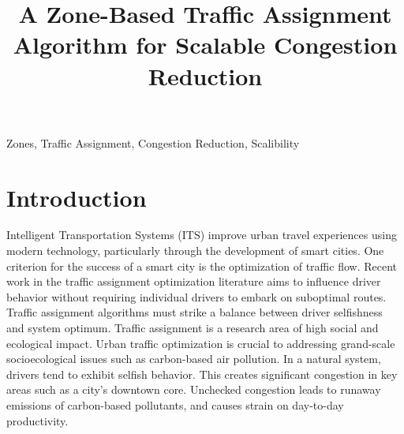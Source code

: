 \documentclass[conference]{IEEEtran}
\begin{document}
\raggedbottom

\title{A Zone-Based Traffic Assignment Algorithm for Scalable Congestion Reduction}


\author{
}

\maketitle

\begin{abstract}

\end{abstract}

\begin{IEEEkeywords}
Zones, Traffic Assignment, Congestion Reduction, Scalibility
\end{IEEEkeywords}

\IEEEpeerreviewmaketitle

\section{Introduction}

Intelligent Transportation Systems (ITS) improve urban travel experiences using modern technology, particularly through the development of smart cities. One criterion for the success of a smart city is the optimization of traffic flow. Recent work in the traffic assignment optimization literature aims to influence driver behavior without requiring individual drivers to embark on suboptimal routes. Traffic assignment algorithms must strike a balance between driver selfishness and system optimum. Traffic assignment is a research area of high social and ecological impact. Urban traffic optimization is crucial to addressing grand-scale socioecological issues such as carbon-based air pollution. In a natural system, drivers tend to exhibit selfish behavior. This creates significant congestion in key areas such as a city's downtown core. Unchecked congestion leads to runaway emissions of carbon-based pollutants, and causes strain on day-to-day productivity.
\end{document}

